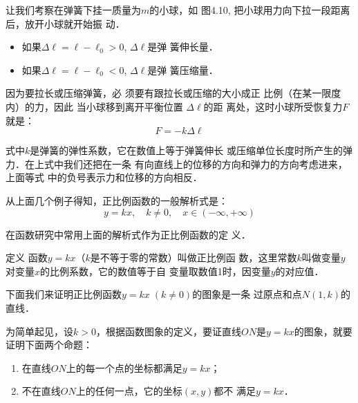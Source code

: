 \begin{figure}[htp]
    \centering
{}
    \caption{}
\end{figure}
\begin{starexample}
    让我们考察在弹簧下挂一质量为$m$的小球，如
图4.10, 把小球用力向下拉一段距离后，放开小球就开始振
动．
\begin{itemize}
    \item 如果$\Delta \ell=\ell-\ell_0>0$, $\Delta \ell$是弹
簧伸长量．
\item 如果$\Delta \ell=\ell-\ell_0<0$, $\Delta \ell$是弹
簧压缩量．
\end{itemize}

因为要拉长或压缩弹簧，必
须要有跟拉长或压缩的大小成正
比例（在某一限度内）的力，因此
当小球移到离开平衡位置 $\Delta \ell$的距
离处，这时小球所受恢复力$F$就是：
\[F=-k \Delta \ell\]

式中$k$是弹簧的弹性系数，它在数值上等于弹簧伸长
或压缩单位长度时所产生的弹力．在上式中我们还把在一条
有向直线上的位移的方向和弹力的方向考虑进来，上面等式
中的负号表示力和位移的方向相反．
\end{starexample}

从上面几个例子得知，正比例函数的一般解析式是：
\[y=kx,\quad  k\ne 0,\quad  x\in(-\infty,+\infty)\]

在函数研究中常用上面的解析式作为正比例函数的定
义．

\begin{blk}{定义}
    函数$y=kx$（$k$是不等于零的常数）叫做正比例函
数，这里常数$k$叫做变量$y$对变量$x$的比例系数，它的数值等于自
变量取数值1时，因变量$y$的对应值．
\end{blk}

下面我们来证明正比例函数$y=kx\; (k\ne 0)$的图象是一条
过原点和点$N(1,k)$的直线．

为简单起见，设$k>0$，根据函数图象的定义，要证直线$ON$是$y=kx$的图象，就要证明下面两个命题：
\begin{enumerate}
    \item 在直线$ON$上的每一个点的坐标都满足$y=kx$；
    \item 不在直线$ON$上的任何一点，它的坐标$(x,y)$都不
满足$y=kx$．
\end{enumerate}


